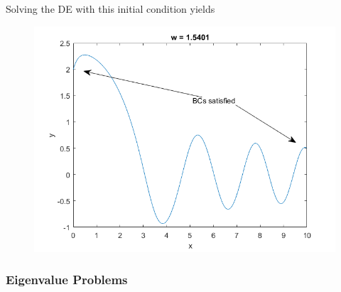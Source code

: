 \documentclass[]{article}
\theoremstyle{definition}
\numberwithin{equation}{section}
\begin{document}
Solving the DE with this initial condition yields
	\begin{figure}[H]
	\centering
	\includegraphics[scale=.7]{ex10_3_fig.png} 
	\label{fig:ex10_3}
\end{figure}
\subsubsection{Eigenvalue Problems}
\end{document}
